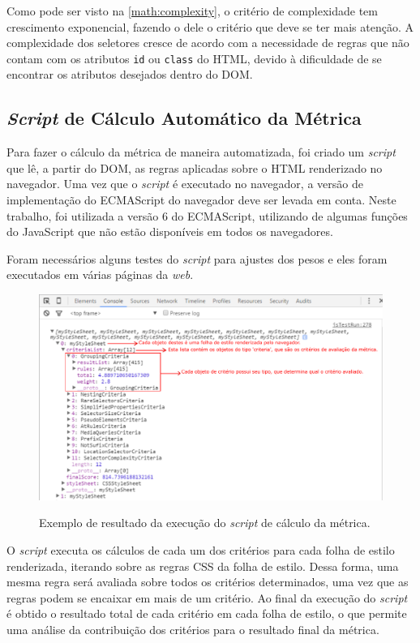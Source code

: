 Como pode ser visto na \autoref{math:complexity}, o critério de complexidade tem crescimento exponencial, fazendo o dele o critério que deve se ter mais atenção. A complexidade dos seletores cresce de acordo com a necessidade de regras que não contam com os atributos \texttt{id} ou \texttt{class} do HTML, devido à dificuldade de se encontrar os atributos desejados dentro do DOM.

\subsection{\textit{Script} de Cálculo Automático da Métrica}

Para fazer o cálculo da métrica de maneira automatizada, foi criado um \textit{script} que lê, a partir do DOM, as regras aplicadas sobre o HTML renderizado no navegador. Uma vez que o \textit{script} é executado no navegador, a versão de implementação do ECMAScript do navegador deve ser levada em conta. Neste trabalho, foi utilizada a versão 6 do ECMAScript, utilizando de algumas funções do JavaScript que não estão disponíveis em todos os navegadores.

Foram necessários alguns testes do \textit{script} para ajustes dos pesos e eles foram executados em várias páginas da \textit{web}.

\begin{figure}[!htb]
	\centering
	\caption{Exemplo de resultado da execução do \textit{script} de cálculo da métrica.}
	\includegraphics[width=1\textwidth]{./04-figuras/calculator}
	\label{fig:calculatorTest}
\end{figure}

O \textit{script} executa os cálculos de cada um dos critérios para cada folha de estilo renderizada, iterando sobre as regras CSS da folha de estilo. Dessa forma, uma mesma regra será avaliada sobre todos os critérios determinados, uma vez que as regras podem se encaixar em mais de um critério. Ao final da execução do \textit{script} é obtido o resultado total de cada critério em cada folha de estilo, o que permite uma análise da contribuição dos critérios para o resultado final da métrica.

